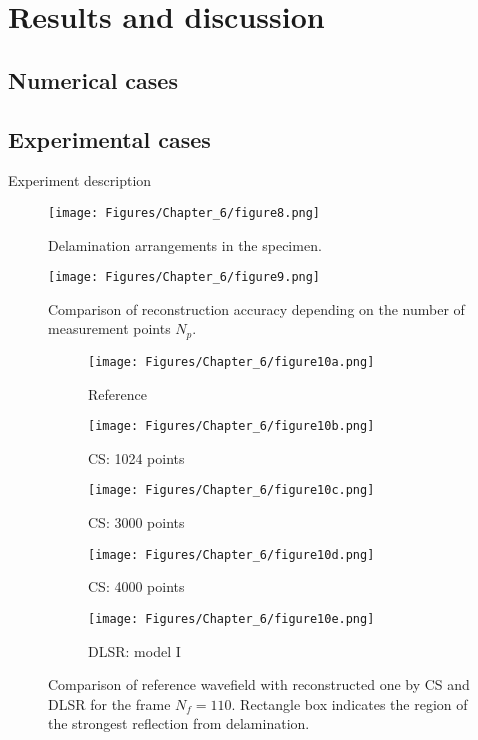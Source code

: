 \section{Results and discussion}
\label{sec64}

\subsection{Numerical cases}

\subsection{Experimental cases}

Experiment description

\begin{figure} [h!]
	\centering
	\texttt{[image: Figures/Chapter\_6/figure8.png]}
	\caption{Delamination arrangements in the specimen.}
	\label{fig:specime}
\end{figure}

\begin{figure} [h!]
	\centering
	\texttt{[image: Figures/Chapter\_6/figure9.png]}
	\caption{Comparison of reconstruction accuracy depending on the number of measurement points $N_p$.}
	\label{fig:points_metrics}
\end{figure}

\begin{figure} [h!]
	\centering
	\begin{subfigure}[b]{0.32\textwidth}
		\centering
		\texttt{[image: Figures/Chapter\_6/figure10a.png]}
		\caption{Reference}
		\label{fig:frame110_ref}
	\end{subfigure}
	\hfill
	\begin{subfigure}[b]{0.32\textwidth}
		\centering
		\texttt{[image: Figures/Chapter\_6/figure10b.png]}
		\caption{CS: 1024 points}
		\label{fig:frame110_CS1024}
	\end{subfigure}
	\hfill
	\begin{subfigure}[b]{0.32\textwidth}
		\centering
		\texttt{[image: Figures/Chapter\_6/figure10c.png]}
		\caption{CS: 3000 points}
		\label{fig:frame110_CS3000}
	\end{subfigure}	
	\hfill
	\begin{subfigure}[b]{0.32\textwidth}
		\centering
		\texttt{[image: Figures/Chapter\_6/figure10d.png]}
		\caption{CS: 4000 points}
		\label{fig:frame110_CS4000}
	\end{subfigure}
	\begin{subfigure}[b]{0.32\textwidth}
		\centering
		\texttt{[image: Figures/Chapter\_6/figure10e.png]}
		\caption{DLSR: model I}
		\label{fig:frame110_Abdalraheem}
	\end{subfigure}
	\caption{Comparison of reference wavefield with reconstructed one by CS and DLSR for the frame $N_f = 110$. Rectangle box indicates the region of the strongest reflection from delamination.}
	\label{fig:frame110_comparison}
\end{figure} 

